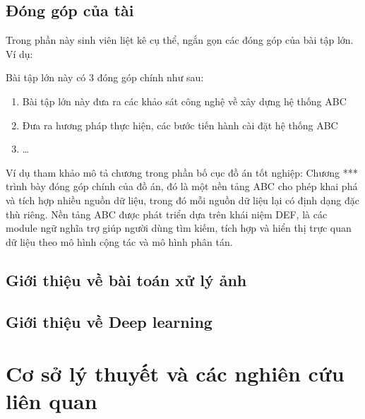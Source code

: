 \subsection*{Đóng góp của tài}
Trong phần này sinh viên liệt kê cụ thể, ngắn gọn các đóng góp của bài tập lớn. Ví dụ: 

Bài tập lớn này có 3 đóng góp chính như sau:

\begin{enumerate}
\item Bài tập lớn này đưa ra các khảo sát công nghệ về xây dựng hệ thống ABC
\item Đưa ra hương pháp thực hiện, các bước tiến hành cài đặt hệ thống ABC
\item \ldots 
\end{enumerate}
Ví dụ tham khảo mô tả chương trong phần bố cục đồ án tốt nghiệp: Chương *** trình bày đóng góp chính của đồ án, đó là một nền tảng ABC cho phép khai phá và tích hợp nhiều nguồn dữ liệu, trong đó mỗi nguồn dữ liệu lại có định dạng đặc thù riêng. Nền tảng ABC được phát triển dựa trên khái niệm DEF, là các module ngữ nghĩa trợ giúp người dùng tìm kiếm, tích hợp và hiển thị trực quan dữ liệu theo mô hình cộng tác và mô hình phân tán.  

\subsection*{Giới thiệu về bài toán xử lý ảnh}

\subsection*{Giới thiệu về Deep learning}


\section{Cơ sở lý thuyết và các nghiên cứu liên quan}
